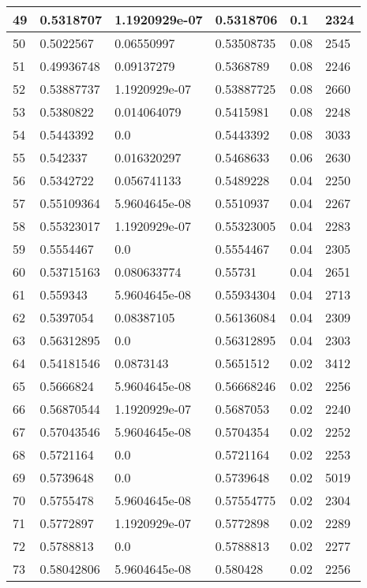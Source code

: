 \begin{longtable}{|l|l|l|l|l|l|}
49 & 0.5318707 & 1.1920929e-07 & 0.5318706 & 0.1 & 2324 \\ \hline 
50 & 0.5022567 & 0.06550997 & 0.53508735 & 0.08 & 2545 \\ \hline 
51 & 0.49936748 & 0.09137279 & 0.5368789 & 0.08 & 2246 \\ \hline 
52 & 0.53887737 & 1.1920929e-07 & 0.53887725 & 0.08 & 2660 \\ \hline 
53 & 0.5380822 & 0.014064079 & 0.5415981 & 0.08 & 2248 \\ \hline 
54 & 0.5443392 & 0.0 & 0.5443392 & 0.08 & 3033 \\ \hline 
55 & 0.542337 & 0.016320297 & 0.5468633 & 0.06 & 2630 \\ \hline 
56 & 0.5342722 & 0.056741133 & 0.5489228 & 0.04 & 2250 \\ \hline 
57 & 0.55109364 & 5.9604645e-08 & 0.5510937 & 0.04 & 2267 \\ \hline 
58 & 0.55323017 & 1.1920929e-07 & 0.55323005 & 0.04 & 2283 \\ \hline 
59 & 0.5554467 & 0.0 & 0.5554467 & 0.04 & 2305 \\ \hline 
60 & 0.53715163 & 0.080633774 & 0.55731 & 0.04 & 2651 \\ \hline 
61 & 0.559343 & 5.9604645e-08 & 0.55934304 & 0.04 & 2713 \\ \hline 
62 & 0.5397054 & 0.08387105 & 0.56136084 & 0.04 & 2309 \\ \hline 
63 & 0.56312895 & 0.0 & 0.56312895 & 0.04 & 2303 \\ \hline 
64 & 0.54181546 & 0.0873143 & 0.5651512 & 0.02 & 3412 \\ \hline 
65 & 0.5666824 & 5.9604645e-08 & 0.56668246 & 0.02 & 2256 \\ \hline 
66 & 0.56870544 & 1.1920929e-07 & 0.5687053 & 0.02 & 2240 \\ \hline 
67 & 0.57043546 & 5.9604645e-08 & 0.5704354 & 0.02 & 2252 \\ \hline 
68 & 0.5721164 & 0.0 & 0.5721164 & 0.02 & 2253 \\ \hline 
69 & 0.5739648 & 0.0 & 0.5739648 & 0.02 & 5019 \\ \hline 
70 & 0.5755478 & 5.9604645e-08 & 0.57554775 & 0.02 & 2304 \\ \hline 
71 & 0.5772897 & 1.1920929e-07 & 0.5772898 & 0.02 & 2289 \\ \hline 
72 & 0.5788813 & 0.0 & 0.5788813 & 0.02 & 2277 \\ \hline 
73 & 0.58042806 & 5.9604645e-08 & 0.580428 & 0.02 & 2256 \\ \hline 

\end{longtable}
